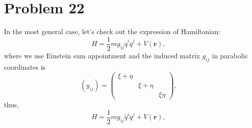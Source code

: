 \section*{Problem 22}

In the most general case, let's check out the expression of Hamiltonian:
\begin{equation*}
    H = \frac{1}{2} m g_{ij} \dot{q}^i \dot{q}^j  +  V\left(\boldsymbol{r}\right),
\end{equation*}
where we use Einstein sum appointment and the induced matrix $g_{ij}$ in parabolic coordinates is
\begin{equation}
    \left(g_{ij}\right)  = \left(
    \begin{matrix}
        \xi + \eta  &               &           \\
                    & \xi + \eta    &           \\
                    &               &  \xi\eta
    \end{matrix}
    \right),
\end{equation}
thus,
\begin{equation}
    H = \frac{1}{2} m g_{ij} \dot{q}^i \dot{q}^j  +  V\left(\boldsymbol{r}\right),
\end{equation}